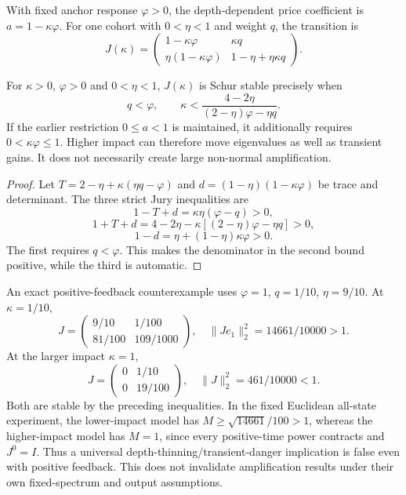 With fixed anchor response $\varphi>0$, the depth-dependent price coefficient is $a=1-\kappa\varphi$. For one cohort with $0<\eta<1$ and weight $q$, the transition is
\[
J(\kappa)=\begin{pmatrix}1-\kappa\varphi&\kappa q\\
\eta(1-\kappa\varphi)&1-\eta+\eta\kappa q\end{pmatrix}.
\]
\begin{proposition}
For $\kappa>0$, $\varphi>0$ and $0<\eta<1$, $J(\kappa)$ is Schur stable precisely when
\[
q<\varphi,\qquad
\kappa<\frac{4-2\eta}{(2-\eta)\varphi-\eta q}.
\]
If the earlier restriction $0\le a<1$ is maintained, it additionally requires $0<\kappa\varphi\le1$. Higher impact can therefore move eigenvalues as well as transient gains. It does not necessarily create large non-normal amplification.
\end{proposition}
\begin{proof}
Let $T=2-\eta+\kappa(\eta q-\varphi)$ and $d=(1-\eta)(1-\kappa\varphi)$ be trace and determinant. The three strict Jury inequalities are
\[
1-T+d=\kappa\eta(\varphi-q)>0,
\]
\[
1+T+d=4-2\eta-\kappa[(2-\eta)\varphi-\eta q]>0,
\]
\[
1-d=\eta+(1-\eta)\kappa\varphi>0.
\]
The first requires $q<\varphi$. This makes the denominator in the second bound positive, while the third is automatic.
\end{proof}

An exact positive-feedback counterexample uses $\varphi=1$, $q=1/10$, $\eta=9/10$. At $\kappa=1/10$,
\[
J=\begin{pmatrix}9/10&1/100\\81/100&109/1000\end{pmatrix},
\quad \|Je_1\|_2^2=14661/10000>1.
\]
At the larger impact $\kappa=1$,
\[
J=\begin{pmatrix}0&1/10\\0&19/100\end{pmatrix},
\quad \|J\|_2^2=461/10000<1.
\]
Both are stable by the preceding inequalities. In the fixed Euclidean all-state experiment, the lower-impact model has $M\ge\sqrt{14661}/100>1$, whereas the higher-impact model has $M=1$, since every positive-time power contracts and $J^0=I$. Thus a universal depth-thinning/transient-danger implication is false even with positive feedback. This does not invalidate amplification results under their own fixed-spectrum and output assumptions.

